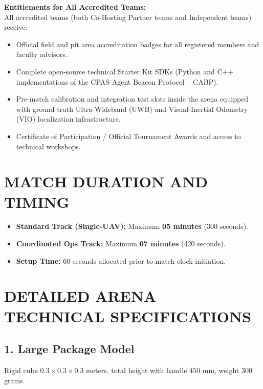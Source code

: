 \documentclass[12pt,a4paper]{article}
\begin{document}
\vspace{0.2cm}
\noindent\textbf{Entitlements for All Accredited Teams:}\\
All accredited teams (both Co-Hosting Partner teams and Independent teams) receive:
\begin{itemize}
\item Official field and pit area accreditation badges for all registered members and faculty advisors.
\item Complete open-source technical Starter Kit SDKs (Python and C++ implementations of the CPAS Agent Beacon Protocol -- CABP).
\item Pre-match calibration and integration test slots inside the arena equipped with ground-truth Ultra-Wideband (UWB) and Visual-Inertial Odometry (VIO) localization infrastructure.
\item Certificate of Participation / Official Tournament Awards and access to technical workshops.
\end{itemize}

\section{MATCH DURATION AND TIMING}

\begin{itemize}
\item \textbf{Standard Track (Single-UAV):} Maximum \textbf{05 minutes} (300 seconds).
\item \textbf{Coordinated Ops Track:} Maximum \textbf{07 minutes} (420 seconds).
\item \textbf{Setup Time:} 60 seconds allocated prior to match clock initiation.
\end{itemize}

\section{DETAILED ARENA TECHNICAL SPECIFICATIONS}

\subsection*{1. Large Package Model}
Rigid cube $0.3 \times 0.3 \times 0.3$ meters, total height with handle $450$ mm, weight $300$ grams.
\end{document}
